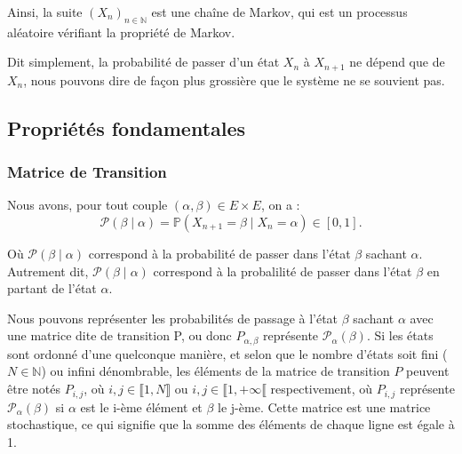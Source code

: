 \documentclass{article}
\begin{document}
Ainsi, la suite $(X_n)_{n \in \mathbb{N}}$ est une chaîne de Markov, qui est un processus aléatoire vérifiant la propriété de Markov. %


Dit simplement, la probabilité de passer d'un état $X_n$ à $X_{n+1}$ ne dépend que de $X_n$, %
nous pouvons dire de façon plus grossière que le système ne se souvient pas.


\subsection{Propriétés fondamentales}


\subsubsection{Matrice de Transition}

Nous avons, pour tout couple \((\alpha,\beta) \in E \times E\), on a :
\[
\mathcal{P}(\beta \mid \alpha) = \mathbb{P}(X_{n+1}=\beta \mid X_n=\alpha) \in [0,1].
\]
\newline

Où $\mathcal{P}(\beta \mid \alpha)$ correspond à la probabilité de passer dans l'état $\beta$ sachant $\alpha$. Autrement dit, $\mathcal{P}(\beta \mid \alpha)$ correspond à la probalilité de passer dans l'état $\beta$ en partant de l'état $\alpha$.
\newline

Nous pouvons représenter les probabilités de passage à l'état $\beta$ sachant $\alpha$ avec une matrice dite de transition P, ou donc $P_{\alpha,\beta}$ représente $ \mathcal{P}_\alpha(\beta)$.  
Si les états sont ordonné d'une quelconque manière, et selon que le nombre d'états soit fini ($N \in \mathbb{N}$) ou infini dénombrable, les éléments de la matrice de transition $P$ peuvent être notés $P_{i,j}$, où $i,j \in \llbracket 1, N \rrbracket$ ou $i,j \in \llbracket 1, +\infty \llbracket$ respectivement, où $P_{i,j}$ représente $\mathcal{P}_\alpha(\beta)$ si $\alpha$ est le i-ème élément et $\beta$ le j-ème.
Cette matrice est une matrice stochastique, ce qui signifie que la somme des éléments de chaque ligne est égale à 1.
\end{document}
